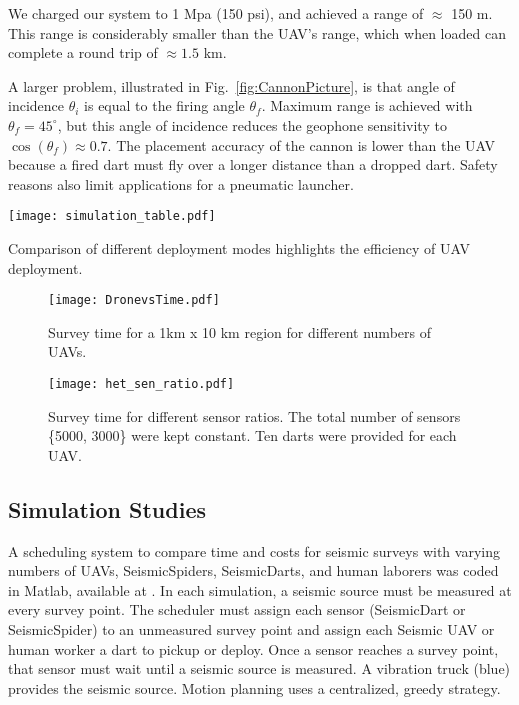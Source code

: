 We charged our system to 1 Mpa (150 psi), and achieved a range of $\approx$ 150 m.
This range is considerably smaller than the UAV's range, which when loaded can complete a round trip of $\approx 1.5$ km.

A larger problem, illustrated in Fig.~\ref{fig:CannonPicture}, is that angle of incidence $\theta_i$ is equal to the firing angle $\theta_f$. 
Maximum range is achieved with $\theta_f = 45^\circ$, but this angle of incidence reduces the geophone sensitivity to $\cos(\theta_f )\approx 0.7$.
The placement accuracy of the cannon is lower than the UAV because a fired dart must fly over a longer distance than a dropped dart. 
Safety reasons also limit applications for a pneumatic launcher.





\begin{table} \centering
  {\texttt{[image: simulation\_table.pdf]}}
 \caption{Comparison of different  deployment modes highlights the efficiency of UAV deployment.} 
 \label{tab:Sim_table}
\end{table}

\begin{figure} \centering
  {\texttt{[image: DronevsTime.pdf]}}
 \caption{Survey time for a 1km x 10 km region for different numbers of UAVs.} 
 \label{fig:DronevsTime}
 \vspace{-1em}
\end{figure}

\begin{figure} \centering
  {\texttt{[image: het\_sen\_ratio.pdf]}}
 \caption{Survey time for different sensor ratios. The total number of sensors \{5000, 3000\} were kept constant. Ten darts were provided for each UAV. } 
 \label{fig:het_sen_ratio}
  \vspace{-1em}
\end{figure}

\subsection{Simulation Studies}
A scheduling system to compare  time and costs for seismic surveys with varying numbers of UAVs, SeismicSpiders, SeismicDarts, and human laborers was coded in  {\sc Matlab}, available at \cite{Srikanth2016seismicScheduler}.
   In each simulation, a seismic source must be measured at every survey point. 
   The scheduler must assign each sensor (SeismicDart or SeismicSpider) to an unmeasured survey point and assign each Seismic UAV or human worker a dart to pickup or deploy.  Once a sensor reaches a survey point, that sensor must wait until a seismic source is measured.
      A vibration truck (blue) provides the seismic source.
   Motion planning uses a centralized, greedy strategy.
   

